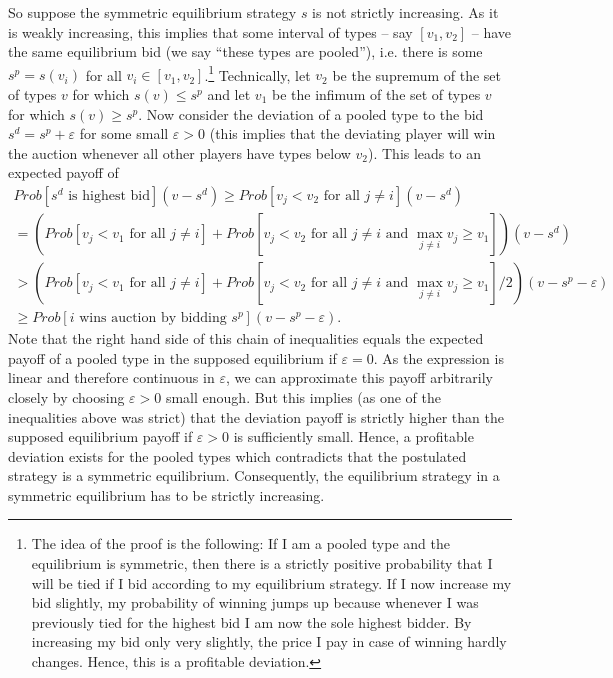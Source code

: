\documentclass[a4paper,11pt]{article}
\begin{document}
So suppose the symmetric equilibrium strategy $s$ is not strictly increasing. As it is weakly increasing, this implies that some interval of types -- say $[v _1,v _2]$ -- have the same equilibrium bid (we say ``these types are pooled''), i.e. there is some $s^p=s(v_i)$ for all $v_i\in[v_1,v_2]$.\footnote{The idea of the proof is the following: If I am a pooled type and the equilibrium is symmetric, then there is a strictly positive probability that I will be tied if I bid according to my equilibrium strategy. If I now increase my bid slightly, my probability of winning jumps up because whenever I was previously tied for the highest bid I am now the sole highest bidder. By increasing my bid only very slightly, the price I pay in case of winning hardly changes. Hence, this is a profitable deviation.} Technically, let $v_2$ be the supremum of the set of types $v$ for which $s(v)\leq s^p$ and let $v_1$ be the infimum of the set of types $v$ for which $s(v)\geq s^p$. Now consider the deviation of a pooled type to the bid $s^d=s^p+\varepsilon $ for some small $\varepsilon >0$ (this implies that the deviating player will win the auction whenever all other players have types below $v_2$). This leads to an expected payoff of
\begin{multline*}
Prob[s^d\text{ is highest bid}]\left(v-s^d\right)\geq Prob[v_j<v_2\text{ for all }j\neq i]\left(v-s^d\right)\\=\left(Prob[v_j<v_1 \text{ for all }j\neq i]+Prob[v_j<v_2 \text{ for all }j\neq i \text{ and }\max_{j\neq i}v_j\geq v_1]\right)\left(v-s^d\right)\\>\left(Prob[v_j<v_1 \text{ for all }j\neq i]+Prob[v_j<v_2 \text{ for all }j\neq i \text{ and }\max_{j\neq i}v_j\geq v_1]/2\right)\left(v-s^p-\varepsilon \right)\\\geq Prob[i\text{ wins auction by bidding }s^p] \left(v-s^p-\varepsilon \right).
\end{multline*}
Note that the right hand side of this chain of inequalities equals the expected payoff of a pooled type in the supposed equilibrium if $\varepsilon =0$. As the expression is linear and therefore continuous in $\varepsilon $, we can approximate this payoff arbitrarily closely by choosing $\varepsilon >0$ small enough. But this implies (as one of the inequalities above was strict) that the deviation payoff is strictly higher than the supposed equilibrium payoff if $\varepsilon>0 $ is sufficiently small. Hence, a profitable deviation exists for the pooled types which contradicts that the postulated strategy is a symmetric equilibrium. Consequently, the equilibrium strategy in a symmetric equilibrium has to be strictly increasing.
\end{document}
